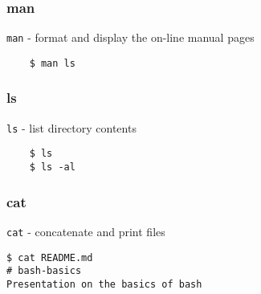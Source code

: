 \documentclass{beamer}
\begin{document}

\begin{frame}[fragile]
\frametitle{man}
	\texttt{man} - format and display the on-line manual pages
	\begin{verbatim}
	$ man ls
	\end{verbatim}
\end{frame}


\begin{frame}[fragile]
\frametitle{ls}
	\texttt{ls} - list directory contents
	\begin{verbatim}
	$ ls
	$ ls -al
	\end{verbatim}
\end{frame}


\begin{frame}[fragile]
\frametitle{cat}
	\texttt{cat} - concatenate and print files
	\begin{verbatim}
$ cat README.md
# bash-basics
Presentation on the basics of bash
	\end{verbatim}
\end{frame}
\end{document}
